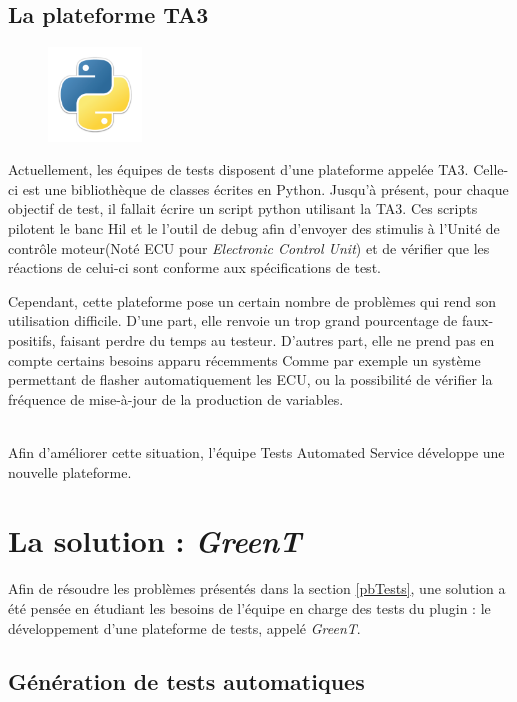 	\subsection{La plateforme TA3}
\begin{figure}
	\includegraphics[width=2.5cm]{contents/images/python.png}
\end{figure}
	Actuellement, les équipes de tests disposent d'une plateforme appelée TA3. Celle-ci est une bibliothèque de classes écrites en Python. Jusqu'à présent, pour chaque objectif de test, il fallait écrire un script python utilisant la TA3. Ces scripts pilotent le banc Hil et le l'outil de debug afin d'envoyer des stimulis à l'Unité de contrôle moteur(Noté ECU pour \textit{Electronic Control Unit}) et de vérifier que les réactions de celui-ci sont conforme aux spécifications de test.

	Cependant, cette plateforme pose un certain nombre de problèmes qui rend son utilisation difficile. D'une part, elle renvoie un trop grand pourcentage de faux-positifs, faisant perdre du temps au testeur. D'autres part, elle ne prend pas en compte certains besoins apparu récemments Comme par exemple un système permettant de flasher automatiquement les ECU, ou la possibilité de vérifier la fréquence de mise-à-jour de la production de variables.
\\~

	Afin d'améliorer cette situation, l'équipe Tests Automated Service développe une nouvelle plateforme.

	\section{La solution : \textit{GreenT}}
	Afin de résoudre les problèmes présentés dans la section \ref{pbTests}, une solution a été pensée en étudiant les besoins de l'équipe en charge des tests du plugin : le développement d'une plateforme de tests, appelé \textit{GreenT}.

	\subsection{Génération de tests automatiques}
